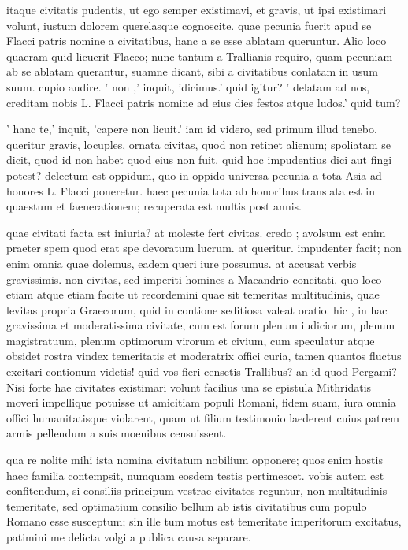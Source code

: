  itaque civitatis pudentis, ut ego semper existimavi, et gravis, ut ipsi existimari volunt, iustum dolorem querelasque cognoscite. quae pecunia fuerit apud se Flacci patris nomine a civitatibus, hanc a se esse ablatam queruntur. Alio loco quaeram quid licuerit Flacco; nunc tantum a Trallianis requiro, quam pecuniam ab se ablatam querantur, suamne dicant, sibi a civitatibus conlatam in usum suum. cupio audire. ' non ,' inquit, 'dicimus.' quid igitur? ' delatam ad nos, creditam nobis L. Flacci patris nomine ad eius dies festos atque ludos.' quid tum?

 ' hanc te,' inquit, 'capere non licuit.' iam id videro, sed primum illud tenebo. queritur gravis, locuples, ornata civitas, quod non retinet alienum; spoliatam se dicit, quod id non habet quod eius non fuit. quid hoc impudentius dici aut fingi potest? delectum est oppidum, quo in oppido universa pecunia a tota Asia ad honores L. Flacci poneretur. haec pecunia tota ab honoribus translata est in quaestum et faenerationem; recuperata est multis post annis.

 quae civitati facta est iniuria? at moleste fert civitas. credo ; avolsum est enim praeter spem quod erat spe devoratum lucrum. at queritur. impudenter facit; non enim omnia quae dolemus, eadem queri iure possumus. at accusat verbis gravissimis. non civitas, sed imperiti homines a Maeandrio concitati. quo loco etiam atque etiam facite ut recordemini quae sit temeritas multitudinis, quae levitas propria Graecorum, quid in contione seditiosa valeat oratio. hic , in hac gravissima et moderatissima civitate, cum est forum plenum iudiciorum, plenum magistratuum, plenum optimorum virorum et civium, cum speculatur atque obsidet rostra vindex temeritatis et moderatrix offici curia, tamen quantos fluctus excitari contionum videtis! quid vos fieri censetis Trallibus? an id quod Pergami? Nisi forte hae civitates existimari volunt facilius una se epistula Mithridatis moveri impellique potuisse ut amicitiam populi Romani, fidem suam, iura omnia offici humanitatisque violarent, quam ut filium testimonio laederent cuius patrem armis pellendum a suis moenibus censuissent.

 qua re nolite mihi ista nomina civitatum nobilium opponere; quos enim hostis haec familia contempsit, numquam eosdem testis pertimescet. vobis autem est confitendum, si consiliis principum vestrae civitates reguntur, non multitudinis temeritate, sed optimatium consilio bellum ab istis civitatibus cum populo Romano esse susceptum; sin ille tum motus est temeritate imperitorum excitatus, patimini me delicta volgi a publica causa separare.

